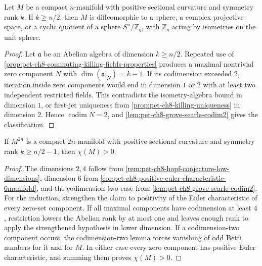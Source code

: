 \begin{theorem}
  \label{thm:pet-ch8-symmetry-rank-half-classification}
  Let $M$ be a compact $n$-manifold with positive sectional curvature and
  symmetry rank $k$. If $k\ge n/2$, then $M$ is diffeomorphic to a sphere, a
  complex projective space, or a cyclic quotient of a sphere $S^n/\mathbb{Z}_q$,
  with $\mathbb{Z}_q$ acting by isometries on the unit sphere.
\end{theorem}
\begin{proof}
  \sketch
  Let \(\mathfrak a\) be an Abelian algebra of dimension \(k\ge n/2\).
  Repeated use of
  \cref{prop:pet-ch8-commuting-killing-fields-properties} produces a maximal
  nontrivial zero component \(N\) with
  \(\dim(\mathfrak a|_N)=k-1\). If its codimension exceeded \(2\), iteration
  inside zero components would end in dimension \(1\) or \(2\) with at least
  two independent restricted fields. This contradicts the isometry-algebra
  bound in dimension \(1\), or first-jet uniqueness from
  \cref{prop:pet-ch8-killing-uniqueness} in dimension \(2\). Hence
  \(\operatorname{codim}N=2\), and
  \cref{lem:pet-ch8-grove-searle-codim2} gives the classification.
\end{proof}

\begin{theorem}
  \label{thm:pet-ch8-puttmann-searle-rong}
  If $M^{2n}$ is a compact $2n$-manifold with positive sectional curvature and
  symmetry rank $k\ge n/2-1$, then $\chi(M)>0$.
\end{theorem}
\begin{proof}
  \sketch
  The dimensions \(2,4\) follow from
  \cref{rem:pet-ch8-hopf-conjecture-low-dimensions}, dimension \(6\) from
  \cref{cor:pet-ch8-positive-euler-characteristic-6manifold}, and the
  codimension-two case from \cref{lem:pet-ch8-grove-searle-codim2}. For the
  induction, strengthen the claim to positivity of the Euler characteristic
  of every zero-set component. If all maximal components have codimension at
  least \(4\), restriction lowers the Abelian rank by at most one and leaves
  enough rank to apply the strengthened hypothesis in lower dimension. If a
  codimension-two component occurs, the codimension-two lemma forces
  vanishing of odd Betti numbers for it and for \(M\). In either case every
  zero component has positive Euler characteristic, and summing them proves
  \(\chi(M)>0\).
\end{proof}

